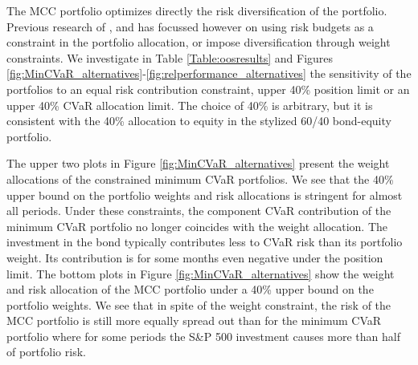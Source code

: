 \documentclass[12pt,a4paper]{article}
\begin{document}
The MCC portfolio optimizes directly the risk diversification of the portfolio. Previous research of \citet{Maillard2010}, \citet{Qian2005} and \citet{Zhu2010} has focussed however on using risk budgets as a constraint in the portfolio allocation, or impose diversification through weight constraints.  We investigate in Table \ref{Table:oosresults} and Figures \ref{fig:MinCVaR_alternatives}-\ref{fig:relperformance_alternatives} the sensitivity of the portfolios to an equal risk contribution constraint, upper 40\% position limit or an upper 40\% CVaR allocation limit. The choice of 40\% is arbitrary, but it is consistent with the 40\% allocation to equity in the stylized 60/40 bond-equity portfolio.





The upper two plots in Figure \ref{fig:MinCVaR_alternatives} present the weight allocations of the constrained minimum CVaR portfolios. We see that the 40\% upper bound on the portfolio weights and risk allocations is stringent for almost all periods. Under these constraints, the component CVaR contribution of the minimum CVaR portfolio no longer coincides with the weight allocation. The investment in the bond typically contributes less to CVaR risk than its portfolio weight. Its contribution is for some months even negative under the position limit. The bottom plots in Figure \ref{fig:MinCVaR_alternatives} show the weight and risk allocation of the MCC portfolio under a 40\% upper bound on the portfolio weights.  We see that in spite of the weight constraint, the risk of the MCC portfolio is still more equally spread out than for the minimum CVaR portfolio where for some periods the S\&P 500 investment causes more than half of portfolio risk.
\end{document}
